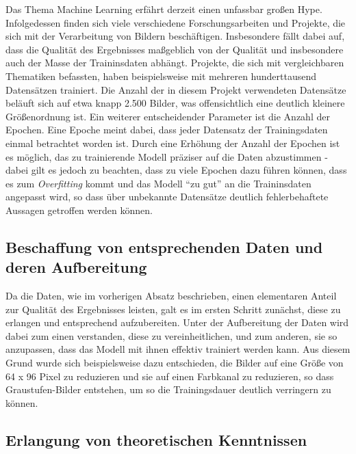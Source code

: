 Das Thema Machine Learning erfährt derzeit einen unfassbar großen Hype. Infolgedessen finden sich viele verschiedene
Forschungsarbeiten und Projekte, die sich mit der Verarbeitung von Bildern beschäftigen. Insbesondere fällt dabei auf,
dass die Qualität des Ergebnisses maßgeblich von der Qualität und insbesondere auch der Masse der Traininsdaten abhängt.
Projekte, die sich mit vergleichbaren Thematiken befassten, haben beispielsweise mit mehreren hunderttausend Datensätzen
trainiert. Die Anzahl der in diesem Projekt verwendeten Datensätze beläuft sich auf etwa knapp 2.500 Bilder, was
offensichtlich eine deutlich kleinere Größenordnung ist.
Ein weiterer entscheidender Parameter ist die Anzahl der Epochen. Eine Epoche meint dabei, dass jeder Datensatz der
Trainingsdaten einmal betrachtet worden ist. Durch eine Erhöhung der Anzahl der Epochen ist es möglich, das zu trainierende
Modell präziser auf die Daten abzustimmen - dabei gilt es jedoch zu beachten, dass zu viele Epochen dazu führen können,
dass es zum \textit{Overfitting} kommt und das Modell ``zu gut'' an die Traininsdaten angepasst wird, so dass
über unbekannte Datensätze deutlich fehlerbehaftete Aussagen getroffen werden können.

\subsection{Beschaffung von entsprechenden Daten und deren Aufbereitung}

Da die Daten, wie im vorherigen Absatz beschrieben, einen elementaren Anteil zur Qualität des Ergebnisses leisten, galt
es im ersten Schritt zunächst, diese zu erlangen und entsprechend aufzubereiten. Unter der Aufbereitung der Daten wird
dabei zum einen verstanden, diese zu vereinheitlichen, und zum anderen, sie so anzupassen, dass das Modell mit ihnen
effektiv trainiert werden kann. Aus diesem Grund wurde sich beispielsweise dazu entschieden, die Bilder auf eine Größe
von 64 x 96 Pixel zu reduzieren und sie auf einen Farbkanal zu reduzieren, so dass Graustufen-Bilder entstehen, um so
die Trainingsdauer deutlich verringern zu können.

\subsection{Erlangung von theoretischen Kenntnissen}


